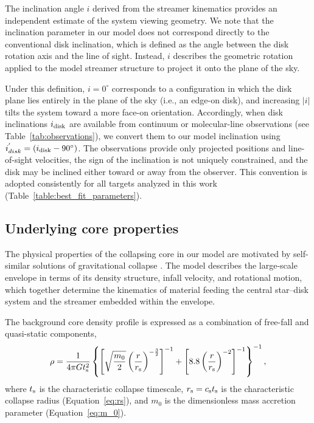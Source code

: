 The inclination angle $i$ derived from the streamer kinematics provides an independent estimate of the system viewing geometry. We note that the inclination parameter in our model does not correspond directly to the conventional disk inclination, which is defined as the angle between the disk rotation axis and the line of sight. Instead, $i$ describes the geometric rotation applied to the model streamer structure to project it onto the plane of the sky.

Under this definition, $i = 0^\circ$ corresponds to a configuration in which the disk plane lies entirely in the plane of the sky (i.e., an edge-on disk), and increasing $|i|$ tilts the system toward a more face-on orientation. Accordingly, when disk inclinations $i_{\rm disk}$ are available from continuum or molecular-line observations (see Table~\ref{tab:observations}), we convert them to our model inclination using $i_{disk}^{'} = \left(i_{\rm disk} - 90^\circ\right)$. The observations provide only projected positions and line-of-sight velocities, the sign of the inclination is not uniquely constrained, and the disk may be inclined either toward or away from the observer. This convention is adopted consistently for all targets analyzed in this work (Table~\ref{table:best_fit_parameters}).

\subsection{Underlying core properties}

The physical properties of the collapsing core in our model are motivated by self-similar solutions of gravitational collapse \citep{Penston_1969}. The model describes the large-scale envelope in terms of its density structure, infall velocity, and rotational motion, which together determine the kinematics of material feeding the central star--disk system and the streamer embedded within the envelope. 

The background core density profile is expressed as a combination of free-fall and quasi-static components, 
\begin{align} 
    \rho = \frac{1}{4\pi G t_{\rm s}^2}\left\{\left[\sqrt{\frac{m_0}{2}}\left(\frac{r}{r_{\rm s}}\right)^{-\frac{3}{2}}\right]^{-1} + \left[8.8 \left(\frac{r}{r_{\rm s}}\right)^{-2}\right]^{-1}\right\}^{-1}, 
\end{align} 
where $t_{\rm s}$ is the characteristic collapse timescale, $r_{\rm s}=c_{\rm s}t_{\rm s}$ is the characteristic collapse radius (Equation~\ref{eq:rs}), and $m_0$ is the dimensionless mass accretion parameter (Equation~\ref{eq:m_0}).

